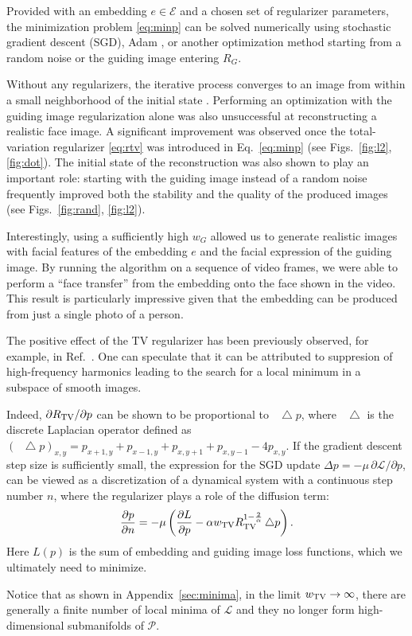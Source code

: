 \documentclass{article}
\def\Img{p}
\def\ImgSpace{\mc{P}}
\def\Emb{e}
\def\EmbSpace{\mc{E}}
\def\Reg{R}
\def\GReg{\Reg_G}
\def\RegTV{\Reg_{\rm TV}}
\def\wG{w_G}
\def\wtv{w_{\rm TV}}
\newcommand*\Laplace{\mathop{}\!\mathbin\bigtriangleup}
\newcommand{\mc}[1]{\mathcal{#1}}
\newcommand{\Eq}[1]{Eq.~\eqref{#1}}
\newcommand{\Figs}[1]{Figs.~\ref{#1}}
\newcommand{\App}[1]{Appendix~\ref{#1}}
\newcommand{\pd}[2]{\frac{\partial #1}{\partial #2}}
\newcommand{\pld}[2]{{{\partial} #1}/{{\partial} #2}}
\newcommand{\omtnips}[1]{#1}
\begin{document}
  Provided with an embedding $\Emb\in\EmbSpace$ and a chosen set of regularizer parameters, the minimization problem \eqref{eq:minp} can
  be solved numerically using stochastic gradient descent (SGD), Adam \cite{kingma:14},
  or another optimization method starting from a random noise or the guiding image entering $\GReg$.

  Without any regularizers, the iterative process converges to an image from within a small neighborhood of the initial state \cite{mahendran:15,szegedy:13}.
  Performing an optimization with the guiding image regularization alone was also unsuccessful at reconstructing a realistic face image.
  A significant improvement was observed once the total-variation regularizer \eqref{eq:rtv} was introduced in \Eq{eq:minp} (see \Figs{fig:l2}, \ref{fig:dot}).
  The initial state of the reconstruction was also shown to play an important role: starting with the guiding image instead of a random noise frequently improved both the
  stability and the quality of the produced images (see \Figs{fig:rand}, \ref{fig:l2}).

  Interestingly, using a sufficiently high $\wG$ allowed us to generate realistic images with facial features of the embedding $\Emb$ and the facial expression of the guiding image.
  By running the algorithm on a sequence of video frames, we were able to perform a ``face transfer'' from the embedding onto the face shown in the video.
  This result is particularly impressive given that the embedding can be produced from just a single photo of a person.

  The positive effect of the TV regularizer has been previously observed, for example, in Ref.~\cite{mahendran:15}.
  One can speculate that it can be attributed to suppresion of high-frequency harmonics leading to the search for a local minimum in a subspace of smooth images.
  \omtnips{
  Indeed, $\pld{\RegTV}{\Img}$ can be shown to be proportional to $\Laplace \Img$, where $\Laplace$ is the discrete Laplacian operator defined as $(\Laplace p)_{x,y} = p_{x+1,y} + p_{x-1,y} + p_{x,y+1} + p_{x,y-1} - 4 p_{x,y}$.
  If the gradient descent step size is sufficiently small, the expression for the SGD update $\Delta \Img = -\mu \, \pld{\mc{L}}{\Img}$, can be viewed as a discretization of a dynamical system with a continuous step number $n$, where the regularizer plays a role of the diffusion term:
  \begin{equation}
    \label{eq:cont}
    \pd{\Img}{n} = -\mu \left( \pd{L}{\Img} - \alpha \wtv \RegTV^{1-\frac{2}{\alpha}} \Laplace \Img \right).
  \end{equation}
  Here $L(\Img)$ is the sum of embedding and guiding image loss functions, which we ultimately need to minimize.
  }
  \omtnips{
  Notice that as shown in \App{sec:minima}, in the limit $\wtv\to \infty$, there are generally a finite number of local minima of $\mc{L}$ and they no longer form high-dimensional submanifolds of $\ImgSpace$.}
\end{document}
